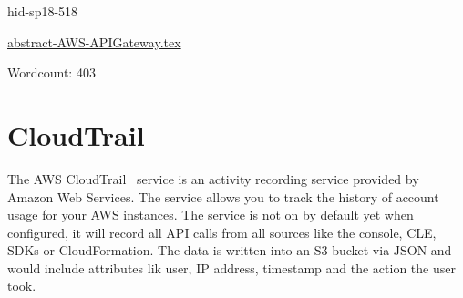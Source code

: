 \begin{IU}

hid-sp18-518

\href{https://github.com/cloudmesh-community/hid-sp18-518/blob/master//technology/abstract-AWS-APIGateway.tex}{abstract-AWS-APIGateway.tex}

 

Wordcount: 403

\end{IU}

\section{CloudTrail}

The AWS CloudTrail~\cite{hid-sp18-518-CloudTrail} service is an activity 
recording service provided by Amazon Web Services. The service allows you 
to track the history of account usage for your AWS instances. The service 
is not on by default yet when configured, it will record all API calls from
all sources like the console, CLE, SDKs or CloudFormation. The data is 
written into an S3 bucket via JSON and would include attributes lik user,
IP address, timestamp and the action the user took.








